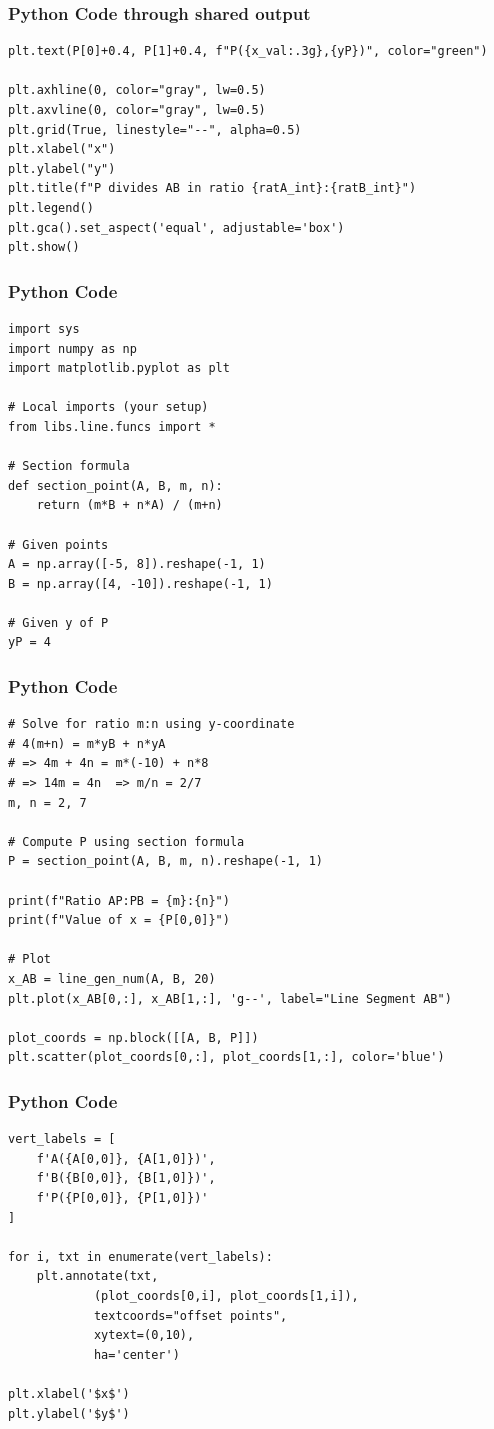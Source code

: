 \documentclass{beamer}
\begin{document}
\begin{frame}[fragile]
	\frametitle{Python Code through shared output}
	\begin{lstlisting}
plt.text(P[0]+0.4, P[1]+0.4, f"P({x_val:.3g},{yP})", color="green")

plt.axhline(0, color="gray", lw=0.5)
plt.axvline(0, color="gray", lw=0.5)
plt.grid(True, linestyle="--", alpha=0.5)
plt.xlabel("x")
plt.ylabel("y")
plt.title(f"P divides AB in ratio {ratA_int}:{ratB_int}")
plt.legend()
plt.gca().set_aspect('equal', adjustable='box')
plt.show()
\end{lstlisting}
\end{frame}
\begin{frame}[fragile]
    \frametitle{Python Code}
    \begin{lstlisting}
import sys 
import numpy as np
import matplotlib.pyplot as plt

# Local imports (your setup)
from libs.line.funcs import *

# Section formula
def section_point(A, B, m, n):
    return (m*B + n*A) / (m+n)

# Given points
A = np.array([-5, 8]).reshape(-1, 1)
B = np.array([4, -10]).reshape(-1, 1)

# Given y of P
yP = 4
\end{lstlisting}
\end{frame}
\begin{frame}[fragile]
    \frametitle{Python Code}
    \begin{lstlisting}
# Solve for ratio m:n using y-coordinate
# 4(m+n) = m*yB + n*yA
# => 4m + 4n = m*(-10) + n*8
# => 14m = 4n  => m/n = 2/7
m, n = 2, 7

# Compute P using section formula
P = section_point(A, B, m, n).reshape(-1, 1)

print(f"Ratio AP:PB = {m}:{n}")
print(f"Value of x = {P[0,0]}")

# Plot
x_AB = line_gen_num(A, B, 20)
plt.plot(x_AB[0,:], x_AB[1,:], 'g--', label="Line Segment AB")

plot_coords = np.block([[A, B, P]])
plt.scatter(plot_coords[0,:], plot_coords[1,:], color='blue')
\end{lstlisting}
\end{frame}
\begin{frame}[fragile]
    \frametitle{Python Code}
    \begin{lstlisting}
vert_labels = [
    f'A({A[0,0]}, {A[1,0]})',
    f'B({B[0,0]}, {B[1,0]})',
    f'P({P[0,0]}, {P[1,0]})'
]

for i, txt in enumerate(vert_labels):
    plt.annotate(txt,
            (plot_coords[0,i], plot_coords[1,i]),
            textcoords="offset points",
            xytext=(0,10),
            ha='center')

plt.xlabel('$x$')
plt.ylabel('$y$')
\end{lstlisting}
\end{frame}
\end{document}
